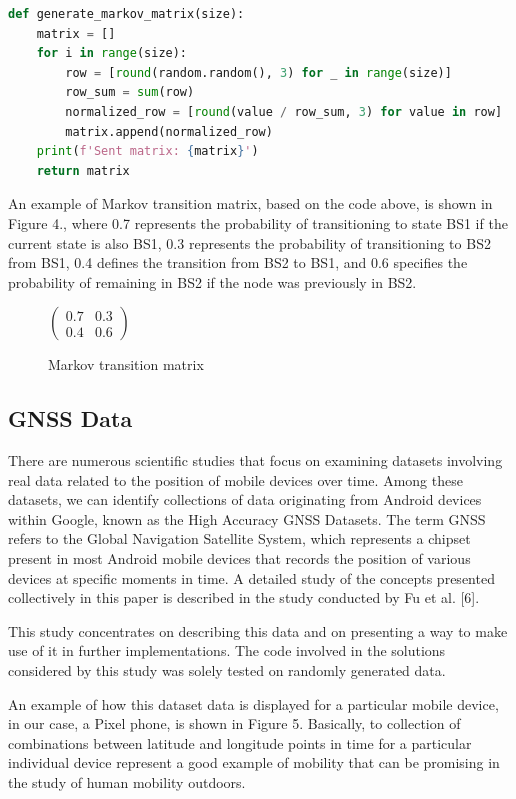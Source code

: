 \documentclass[conference]{IEEEtran}
\begin{document}
\begin{lstlisting}[language=Python]
def generate_markov_matrix(size):
    matrix = []
    for i in range(size):
        row = [round(random.random(), 3) for _ in range(size)]
        row_sum = sum(row)
        normalized_row = [round(value / row_sum, 3) for value in row]
        matrix.append(normalized_row)
    print(f'Sent matrix: {matrix}')
    return matrix
\end{lstlisting}

An example of Markov transition matrix, based on the code above, is shown in Figure 4., where 0.7 represents the probability of transitioning to state BS1 if the current state is also BS1, 0.3 represents the probability of transitioning to BS2 from BS1, 0.4 defines the transition from BS2 to BS1, and 0.6 specifies the probability of remaining in BS2 if the node was previously in BS2.
\begin{figure}[ht]
\centering
    $\begin{pmatrix}
        0.7 & 0.3 \\
        0.4 & 0.6
    \end{pmatrix}$
\caption{Markov transition matrix}
\end{figure}

\subsection{GNSS Data}
There are numerous scientific studies that focus on examining datasets involving real data related to the position of mobile devices over time. Among these datasets, we can identify collections of data originating from Android devices within Google, known as the High Accuracy GNSS Datasets. The term GNSS refers to the Global Navigation Satellite System, which represents a chipset present in most Android mobile devices that records the position of various devices at specific moments in time. A detailed study of the concepts presented collectively in this paper is described in the study conducted by Fu et al. [6].

This study concentrates on describing this data and on presenting a way to make use of it in further implementations. The code involved in the solutions considered by this study was solely tested on randomly generated data.

An example of how this dataset data is displayed for a particular mobile device, in our case, a Pixel phone, is shown in Figure 5. Basically, to collection of combinations between latitude and longitude points in time for a particular individual device represent a good example of mobility that can be promising in the study of human mobility outdoors.
\end{document}
